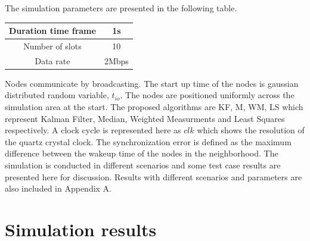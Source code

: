 \documentclass[a4paper,10pt]{report}
\begin{document}
The simulation parameters are presented in the following table.
\begin{center}
    \begin{tabular}{ | c | c |}
    \hline
    Duration time frame & 1s \\ \hline
    Number of slots &  10 \\ \hline
    Data rate &  2Mbps \\ \hline
    \end{tabular}
\end{center}
Nodes communicate by broadcasting. The start up time of the nodes is
gaussian distributed random variable, $t_{io}$. The nodes are
positioned uniformly across the simulation area at the start. The
proposed algorithms are KF, M, WM, LS which represent Kalman Filter,
Median, Weighted Measurments and Least Squares respectively. A clock
cycle is represented here as $clk$ which shows the resolution of the
quartz crystal clock. The synchronization error is defined as the
maximum difference between the wakeup time of the nodes in the
neighborhood. The simulation is conducted in different scenarios and
some test case results are presented here for discussion. Results
with different scenarios and parameters are also included in
Appendix A.
\section{\textbf{Simulation results}}
\end{document}
